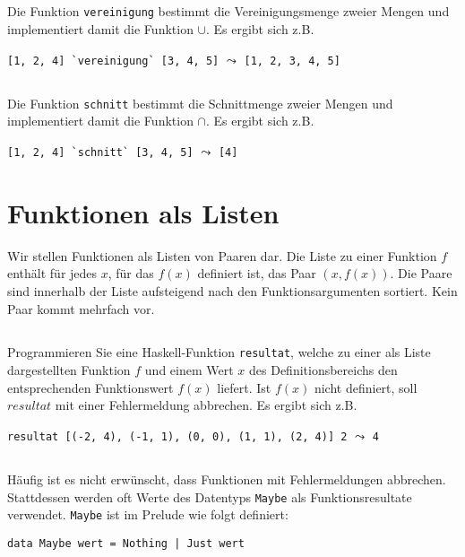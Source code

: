 \documentclass[
  10pt,                   %
  DIV12,
  german,                 %
  oneside,                %
  parskip=half,           %
  headings=normal,        %
  captions=tableheading,  %
]{scrartcl}
\begin{document}
\subsection{}
Die Funktion \lstinline|vereinigung| bestimmt die Vereinigungsmenge zweier Mengen und
implementiert damit die Funktion $\cup$. Es ergibt sich z.B.
\begin{center}
\lstinline|[1, 2, 4] `vereinigung` [3, 4, 5]|  $\leadsto$ \lstinline|[1, 2, 3, 4, 5]|
\end{center}
\subsection{}
Die Funktion \lstinline|schnitt| bestimmt die Schnittmenge zweier Mengen und implementiert
damit die Funktion $\cap$. Es ergibt sich z.B.
\begin{center}
\lstinline|[1, 2, 4] `schnitt` [3, 4, 5]| $\leadsto$ \lstinline|[4]|
\end{center}
\section{Funktionen als Listen}
Wir stellen Funktionen als Listen von Paaren dar. Die Liste zu einer Funktion $f$ enthält
für jedes $x$, für das $f (x)$ definiert ist, das Paar $(x, f(x))$. Die Paare sind innerhalb der Liste
aufsteigend nach den Funktionsargumenten sortiert. Kein Paar kommt mehrfach vor.
\subsection{}
Programmieren Sie eine Haskell-Funktion \lstinline|resultat|, welche zu
einer als Liste dargestellten Funktion $f$ und einem Wert $x$ des Definitionsbereichs
den entsprechenden Funktionswert $f(x)$ liefert. Ist $f(x)$ nicht definiert, soll $resultat$
mit einer Fehlermeldung abbrechen. Es ergibt sich z.B.
\begin{center}
\lstinline|resultat [(-2, 4), (-1, 1), (0, 0), (1, 1), (2, 4)] 2| $\leadsto$ \lstinline|4|
\end{center}
\subsection{}
Häufig ist es nicht erwünscht, dass Funktionen mit Fehlermeldungen abbrechen.
Stattdessen werden oft Werte des Datentyps \lstinline|Maybe| als Funktionsresultate verwendet.
\lstinline|Maybe| ist im Prelude wie folgt definiert:
\begin{center}
\lstinline!data Maybe wert = Nothing | Just wert!
\end{center}
\end{document}

